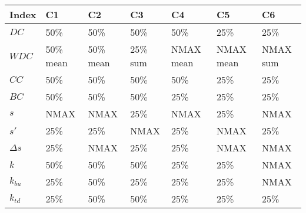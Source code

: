 \begin{table}[ht]
\centering
\begin{tabular}{lllllll}
  \hline
Index & C1 & C2 & C3 & C4 & C5 & C6 \\
  \hline
\(\displaystyle DC \) & {\color[HTML]{00D768} 50\% } & {\color[HTML]{EF2A00} 50\% } & {\color[HTML]{0051D7} 50\% } & {\color[HTML]{6200D7} 50\% } & {\color{orange} 25\% } & {\color[HTML]{9B9B9B} 25\% } \\
\(\displaystyle WDC \) &   {\color[HTML]{EF2A00} 50\% mean} & {\color[HTML]{00D768} 50\% mean} & {\color[HTML]{0051D7} 25\% sum} & {\color{orange} NMAX mean} & {\color[HTML]{6200D7} NMAX mean} & {\color[HTML]{9B9B9B} NMAX sum} \\
\(\displaystyle CC \) &   {\color[HTML]{00D768} 50\% } & {\color[HTML]{EF2A00} 50\% } & {\color[HTML]{0051D7} 50\% } & {\color[HTML]{6200D7} 50\% } & {\color{orange} 25\% } & {\color[HTML]{9B9B9B} 25\% } \\
\(\displaystyle BC \) &   {\color[HTML]{00D768} 50\% } & {\color[HTML]{0051D7} 50\% } & {\color[HTML]{EF2A00} 50\% } & {\color{orange} 25\% } & {\color[HTML]{6200D7} 25\% } & {\color[HTML]{9B9B9B} 25\% } \\
\(\displaystyle s \) &   {\color[HTML]{00D768} NMAX } & {\color[HTML]{EF2A00} NMAX } & {\color[HTML]{0051D7} 25\% } & {\color{orange} NMAX } & {\color[HTML]{6200D7} 25\% } & {\color[HTML]{9B9B9B} NMAX } \\
\(\displaystyle s' \) &   {\color[HTML]{EF2A00} 25\% } & {\color[HTML]{0051D7} 25\% } & {\color[HTML]{00D768} NMAX } & {\color[HTML]{6200D7} 25\% } & {\color{orange} NMAX } & {\color[HTML]{9B9B9B} 25\% } \\
\(\displaystyle \Delta s \) &   {\color[HTML]{00D768} 25\% } & {\color[HTML]{EF2A00} NMAX } & {\color[HTML]{0051D7} 25\% } & {\color[HTML]{6200D7} 25\% } & {\color{orange} NMAX } & {\color[HTML]{9B9B9B} NMAX } \\
\(\displaystyle k \) &   {\color[HTML]{00D768} 50\% } & {\color[HTML]{EF2A00} 50\% } & {\color[HTML]{0051D7} 50\% } & {\color[HTML]{6200D7} 25\% } & {\color{orange} 25\% } & {\color[HTML]{9B9B9B} NMAX } \\
\(\displaystyle k_{bu} \) &   {\color[HTML]{00D768} 25\% } & {\color[HTML]{EF2A00} 50\% } & {\color[HTML]{0051D7} 25\% } & {\color[HTML]{6200D7} 25\% } & {\color{orange} 25\% } & {\color[HTML]{9B9B9B} NMAX } \\
\(\displaystyle k_{td} \) &   {\color[HTML]{EF2A00} 25\% } & {\color[HTML]{00D768} 50\% } & {\color[HTML]{0051D7} 50\% } & {\color[HTML]{6200D7} 25\% } & {\color{orange} 25\% } & {\color[HTML]{9B9B9B} 25\% } \\

\end{tabular}
\end{table}

